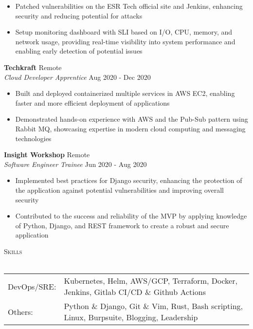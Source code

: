 \documentclass[a4paper]{article}
\newcommand{\lineunder} {
    \vspace*{-8pt} \\
    \hspace*{-18pt} \hrulefill \\
}
\newcommand{\header} [1] {
    {\hspace*{-18pt}\vspace*{6pt} \textsc{#1}}
    \vspace*{-6pt} \lineunder
}
\begin{document}
\begin{itemize} \itemsep 1pt
	\item Patched vulnerabilities on the ESR Tech official site and Jenkins, enhancing security and reducing potential for attacks
	\item Setup monitoring dashboard with SLI based on I/O, CPU, memory, and network usage, providing real-time visibility into system performance and enabling early detection of potential issues
\end{itemize}
\textbf{Techkraft} \hfill Remote\\
\textit{Cloud Developer Apprentice} \hfill Aug 2020 - Dec 2020\\
\vspace{-1mm}
\begin{itemize} \itemsep 1pt
	\item Built and deployed containerized multiple services in AWS EC2, enabling faster and more efficient deployment of applications
	\item Demonstrated hands-on experience with AWS and the Pub-Sub pattern using Rabbit MQ, showcasing expertise in modern cloud computing and messaging technologies
\end{itemize}
\textbf{Insight Workshop} \hfill Remote\\
\textit{Software Engineer Trainee} \hfill Jun 2020 - Aug 2020\\
\vspace{-1mm}
\begin{itemize} \itemsep 1pt
	\item Implemented best practices for Django security, enhancing the protection of the application against potential vulnerabilities and improving overall security
	\item Contributed to the success and reliability of the MVP by applying knowledge of Python, Django, and REST framework to create a robust and secure application
\end{itemize}

\header{Skills}
\begin{tabularx}{\textwidth}{ l X } 
	DevOps/SRE: & Kubernetes, Helm, AWS/GCP, Terraform, Docker, Jenkins, Gitlab CI/CD \& Github Actions      \\
	Others:     & Python \& Django, Git \& Vim, Rust, Bash scripting, Linux, Burpsuite, Blogging, Leadership \\
\end{tabularx}
\vspace{2mm}
\end{document}
